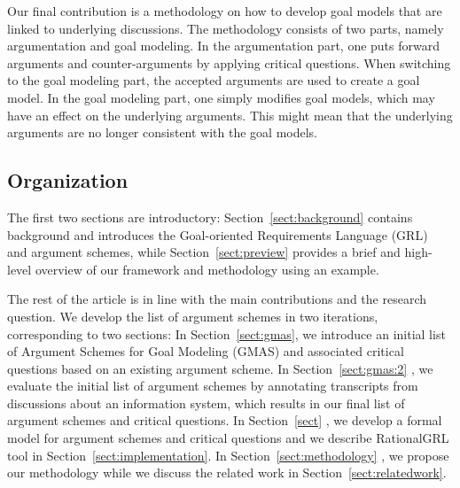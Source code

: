 Our final contribution is a methodology on how to develop goal models that are linked to underlying discussions. The methodology consists of two parts, namely argumentation and goal modeling. In the argumentation part, one puts forward arguments and counter-arguments by applying critical questions. When switching to the goal modeling part, the accepted arguments are used to create a goal model. In the goal modeling part, one simply modifies goal models, which may have an effect on the underlying arguments. This might mean that the underlying arguments are no longer consistent with the goal models.

\subsection{Organization}

The first two sections are introductory: Section~\ref{sect:background} contains background and introduces the Goal-oriented Requirements Language (GRL)~\cite{}  %
and argument schemes, while Section~\ref{sect:preview} provides a brief and high-level overview of our framework and methodology using an example. 

The rest of the article is in line with the main contributions and the research question. We develop the list of argument schemes in two iterations, corresponding to two sections: In Section~\ref{sect:gmas}, we introduce an initial list of Argument Schemes for Goal Modeling (GMAS) and associated critical questions based on an existing argument scheme. In Section~\ref{sect:gmas:2} %
, we evaluate the initial list of argument schemes by annotating transcripts from discussions about an information system, which results in our final list of argument schemes and critical questions. In Section~\ref{sect} %
, we develop a formal model for argument schemes and critical questions and we describe RationalGRL tool in Section~\ref{sect:implementation}. In Section~\ref{sect:methodology} %
, we propose our methodology while we discuss the related work in Section~\ref{sect:relatedwork}. %


